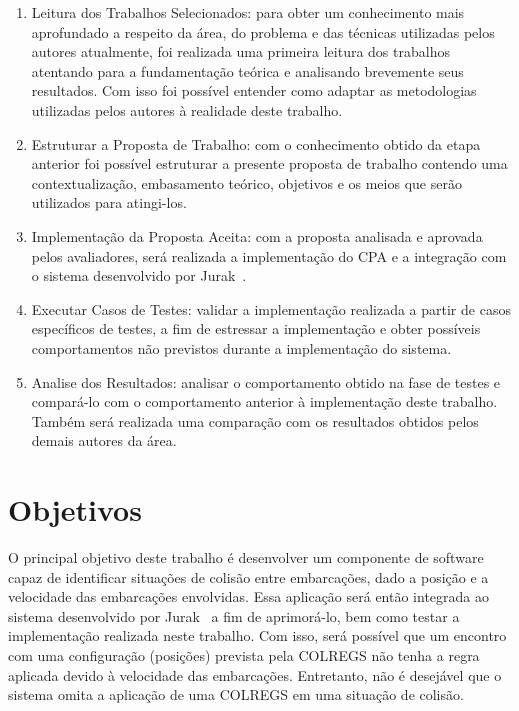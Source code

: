 \begin{enumerate}[label=\alph*)]
            \item Leitura dos Trabalhos Selecionados: para obter um conhecimento mais aprofundado a respeito da área, do problema e das técnicas utilizadas pelos autores atualmente, foi realizada uma primeira leitura dos trabalhos atentando para a fundamentação teórica e analisando brevemente seus resultados. Com isso foi possível entender como adaptar as metodologias utilizadas pelos autores à realidade deste trabalho.
            
            \item Estruturar a Proposta de Trabalho: com o conhecimento obtido da etapa anterior foi possível estruturar a presente proposta de trabalho contendo uma contextualização, embasamento teórico, objetivos e os meios que serão utilizados para atingi-los.
            
            \item Implementação da Proposta Aceita: com a proposta analisada e aprovada pelos avaliadores, será realizada a implementação do CPA e a integração com o sistema desenvolvido por Jurak~\cite{JURAK2020}.
            
            \item Executar Casos de Testes: validar a implementação realizada a partir de casos específicos de testes, a fim de estressar a implementação e obter possíveis comportamentos não previstos durante a implementação do sistema.
            
            \item Analise dos Resultados: analisar o comportamento obtido na fase de testes e compará-lo com o comportamento anterior à implementação deste trabalho. Também será realizada uma comparação com os resultados obtidos pelos demais autores da área. 
        \end{enumerate}
        
        
    \section{Objetivos}
        O principal objetivo deste trabalho é desenvolver um componente de software capaz de identificar situações de colisão entre embarcações, dado a posição e a velocidade das embarcações envolvidas. Essa aplicação será então integrada ao sistema desenvolvido por Jurak~\cite{JURAK2020} a fim de aprimorá-lo, bem como testar a implementação realizada neste trabalho. Com isso, será possível que um encontro com uma configuração (posições) prevista pela COLREGS não tenha a regra aplicada devido à velocidade das embarcações. Entretanto, não é desejável que o sistema omita a aplicação de uma COLREGS em uma situação de colisão. 
        
